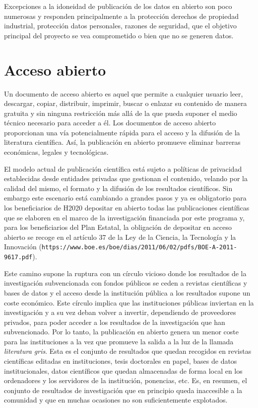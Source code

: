 \documentclass[10pt,twoside,spanish]{article}
\numberwithin{equation}{section}
\begin{document}
Excepciones a la idoneidad de publicación de los datos en abierto son poco numerosas y responden principalmente a la protección derechos de propiedad industrial, protección datos personales, razones de seguridad, que el objetivo principal del proyecto se vea comprometido o bien que no se generen datos.

\section{Acceso abierto}

Un documento de acceso abierto es aquel que permite a cualquier usuario leer, descargar, copiar, distribuir, imprimir, buscar o enlazar su contenido de manera gratuita y sin ninguna restricción más allá de la que pueda suponer el medio técnico necesario para acceder a él. Los documentos de acceso abierto proporcionan una vía potencialmente rápida para el acceso y la difusión de la literatura científica. Así, la publicación en abierto promueve eliminar barreras económicas, legales y tecnológicas.

El modelo actual de publicación científica está sujeto a políticas de privacidad establecidas desde entidades privadas que gestionan el contenido, velando por la calidad del mismo, el formato y la difusión de los resultados científicos.  Sin embargo este escenario está cambiando a grandes pasos y ya es obligatorio para los beneficiarios de H2020 depositar en abierto todas las publicaciones científicas que se elaboren en el marco de la investigación financiada por este programa y, para los beneficiarios del Plan Estatal, la obligación de depositar en acceso abierto se recoge en el artículo 37 de la Ley de la Ciencia, la Tecnología y la Innovación (\texttt{https://www.boe.es/boe/dias/2011/06/02/pdfs/BOE-A-2011-9617.pdf}).

Este camino supone la ruptura con un círculo vicioso donde los resultados de la investigación subvencionada con fondos públicos se ceden a revistas científicas y bases de datos y el acceso desde la institución pública a los resultados supone un coste económico. Este círculo implica que las instituciones públicas inviertan en la investigación y a su vez deban volver a invertir, dependiendo de proveedores privados, para poder acceder a los resultados de la investigación que han subvencionado. Por lo tanto, la publicación en abierto genera un menor coste para las instituciones a la vez que promueve la salida a la luz de la llamada  {\em literatura gris}. Esta es el conjunto de resultados que quedan recogidos en revistas científicas editadas en instituciones, tesis doctorales en papel, bases de datos institucionales, datos científicos que quedan almacenadas de forma local en los ordenadores y los servidores de la institución, ponencias, etc. Es, en resumen, el conjunto de resultados de investigación que en principio queda inaccesible a la comunidad y que en muchas ocasiones no son suficientemente explotados.
\end{document}
